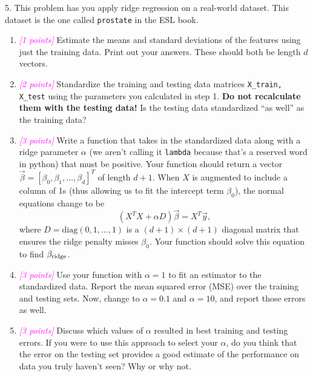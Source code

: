 \documentclass{article}
\newcommand{\points}[1]{\small\textcolor{magenta}{\emph{[#1 points]}} \normalsize}
\begin{document}
5.
This problem has you apply ridge regression on a real-world dataset.
This dataset is the one called {\tt prostate} 
in the ESL book.
\begin{enumerate}
\item \points{1} Estimate the means and standard deviations of the features using just the training data.
  Print out your answers. These should both be length $d$ vectors.
\item \points{2} Standardize the training and testing data matrices {\tt X\_train, X\_test}
  using the parameters you calculated in step 1. {\bf Do not recalculate them with the testing data!}
  Is the testing data standardized ``as well'' as the training data?
\item \points{3} Write a function that takes in the standardized data along with a ridge 
  parameter $\alpha$ (we aren't calling it {\tt lambda} because that's a reserved word in python)
  that must be positive.
  Your function should return a vector $\vec \beta = [\beta_0, \beta_1, \ldots, \beta_d]^T$ of length $d +1$.
  When $X$ is augmented to include a column of 1s (thus allowing us to fit the intercept term $\beta_0$),
  the normal equations change to be
  $$
  (X^T X + \alpha D) \vec \beta = X^T \vec y,
  $$
  where $D = \mathrm{diag}(0, 1, \ldots, 1)$ is a $(d+1) \times (d+1)$ diagonal matrix that ensures
  the ridge penalty misses $\beta_0$.
  Your function should solve this equation to find $\beta_{\rm ridge}$.
\item \points{3}
  Use your function with $\alpha = 1$ to fit an estimator to the standardized data.
  Report the mean squared error (MSE) over the training and testing sets.
  Now, change to $\alpha = 0.1$ and $\alpha=10$, and report those errors as well.
\item \points{3}
  Discuss which values of $\alpha$ resulted in best training and testing errors.
  If you were to use this approach to select your $\alpha$, do you think that
  the error on the testing set provides a good estimate 
  of the performance on data you truly haven't seen?
  Why or why not.
\end{enumerate}
\end{document}
